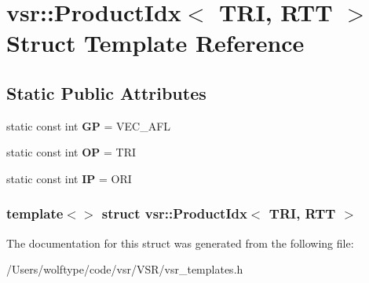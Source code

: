 \hypertarget{structvsr_1_1_product_idx_3_01_t_r_i_00_01_r_t_t_01_4}{\section{vsr\-:\-:Product\-Idx$<$ T\-R\-I, R\-T\-T $>$ Struct Template Reference}
\label{structvsr_1_1_product_idx_3_01_t_r_i_00_01_r_t_t_01_4}
}
\subsection*{Static Public Attributes}
\begin{DoxyCompactItemize}
\item 
\hypertarget{structvsr_1_1_product_idx_3_01_t_r_i_00_01_r_t_t_01_4_a36c3e8802f93298b785dfc76a05dc12a}{static const int {\bfseries G\-P} = V\-E\-C\-\_\-\-A\-F\-L}\label{structvsr_1_1_product_idx_3_01_t_r_i_00_01_r_t_t_01_4_a36c3e8802f93298b785dfc76a05dc12a}

\item 
\hypertarget{structvsr_1_1_product_idx_3_01_t_r_i_00_01_r_t_t_01_4_ac9b302db161d8ace525bfd361ba8dccd}{static const int {\bfseries O\-P} = T\-R\-I}\label{structvsr_1_1_product_idx_3_01_t_r_i_00_01_r_t_t_01_4_ac9b302db161d8ace525bfd361ba8dccd}

\item 
\hypertarget{structvsr_1_1_product_idx_3_01_t_r_i_00_01_r_t_t_01_4_a9631519f7642a7bd0feffd98040affef}{static const int {\bfseries I\-P} = O\-R\-I}\label{structvsr_1_1_product_idx_3_01_t_r_i_00_01_r_t_t_01_4_a9631519f7642a7bd0feffd98040affef}

\end{DoxyCompactItemize}
\subsubsection*{template$<$$>$ struct vsr\-::\-Product\-Idx$<$ T\-R\-I, R\-T\-T $>$}



The documentation for this struct was generated from the following file\-:\begin{DoxyCompactItemize}
\item 
/\-Users/wolftype/code/vsr/\-V\-S\-R/vsr\-\_\-templates.\-h\end{DoxyCompactItemize}
